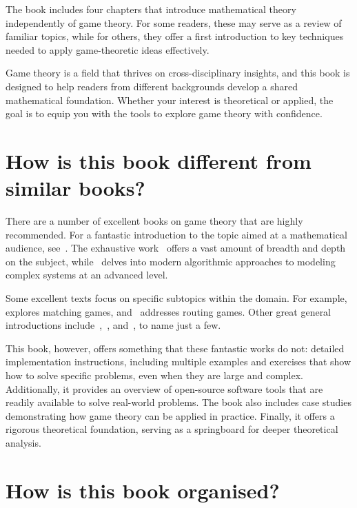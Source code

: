 The book includes four chapters that introduce mathematical theory independently
of game theory. For some readers, these may serve as a review of familiar
topics, while for others, they offer a first introduction to key techniques
needed to apply game-theoretic ideas effectively.  

Game theory is a field that thrives on cross-disciplinary insights, and this
book is designed to help readers from different backgrounds develop a shared
mathematical foundation. Whether your interest is theoretical or applied, the
goal is to equip you with the tools to explore game theory with confidence.  

\section{How is this book different from similar books?}

There are a number of excellent books on game theory that are highly
recommended. For a fantastic introduction to the topic aimed at a mathematical
audience, see~\cite{webb2007game}. The exhaustive work~\cite{maschler2020game}
offers a vast amount of breadth and depth on the subject,
while~\cite{roughgarden2010algorithmic} delves into modern algorithmic
approaches to modeling complex systems at an advanced level.

Some excellent texts focus on specific subtopics within the domain. For
example,~\cite{gusfield1989stable} explores matching games,
and~\cite{roughgarden2002selfish} addresses routing games. Other great general
introductions include~\cite{osborne2004introduction},~\cite{watson2002strategy},
and~\cite{gusfield1989stable}, to name just a few.

This book, however, offers something that these fantastic works do not: detailed
implementation instructions, including multiple examples and exercises that show
how to solve specific problems, even when they are large and complex.
Additionally, it provides an overview of open-source software tools that are
readily available to solve real-world problems. The book also includes case
studies demonstrating how game theory can be applied in practice. Finally, it
offers a rigorous theoretical foundation, serving as a springboard for deeper
theoretical analysis.

\section{How is this book organised?}

